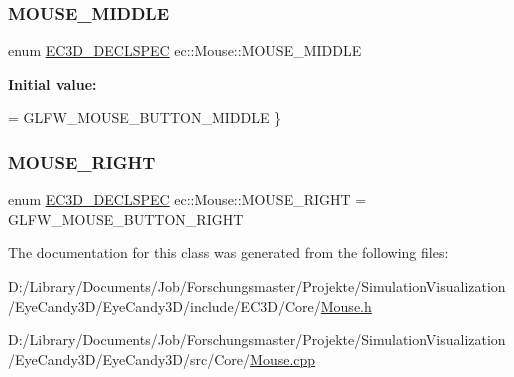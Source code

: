 \mbox{\label{classec_1_1_mouse_a0fbdf11d1d258a805821e37141f95131}} 
\subsubsection{\texorpdfstring{M\+O\+U\+S\+E\+\_\+\+M\+I\+D\+D\+LE}{MOUSE\_MIDDLE}}
{\footnotesize\ttfamily enum \mbox{\hyperlink{_common_8h_aac42573e202ca3dd4d259c81691e2369}{E\+C3\+D\+\_\+\+D\+E\+C\+L\+S\+P\+EC}} ec\+::\+Mouse\+::\+M\+O\+U\+S\+E\+\_\+\+M\+I\+D\+D\+LE}

{\bfseries Initial value\+:}
\begin{DoxyCode}
= GLFW\_MOUSE\_BUTTON\_MIDDLE
        \}
\end{DoxyCode}
\mbox{\label{classec_1_1_mouse_a433aac3a68d060b7f330976e5855ddad}} 
\subsubsection{\texorpdfstring{M\+O\+U\+S\+E\+\_\+\+R\+I\+G\+HT}{MOUSE\_RIGHT}}
{\footnotesize\ttfamily enum \mbox{\hyperlink{_common_8h_aac42573e202ca3dd4d259c81691e2369}{E\+C3\+D\+\_\+\+D\+E\+C\+L\+S\+P\+EC}} ec\+::\+Mouse\+::\+M\+O\+U\+S\+E\+\_\+\+R\+I\+G\+HT = G\+L\+F\+W\+\_\+\+M\+O\+U\+S\+E\+\_\+\+B\+U\+T\+T\+O\+N\+\_\+\+R\+I\+G\+HT}



The documentation for this class was generated from the following files\+:\begin{DoxyCompactItemize}
\item 
D\+:/\+Library/\+Documents/\+Job/\+Forschungsmaster/\+Projekte/\+Simulation\+Visualization/\+Eye\+Candy3\+D/\+Eye\+Candy3\+D/include/\+E\+C3\+D/\+Core/\mbox{\hyperlink{_mouse_8h}{Mouse.\+h}}\item 
D\+:/\+Library/\+Documents/\+Job/\+Forschungsmaster/\+Projekte/\+Simulation\+Visualization/\+Eye\+Candy3\+D/\+Eye\+Candy3\+D/src/\+Core/\mbox{\hyperlink{_mouse_8cpp}{Mouse.\+cpp}}\end{DoxyCompactItemize}
